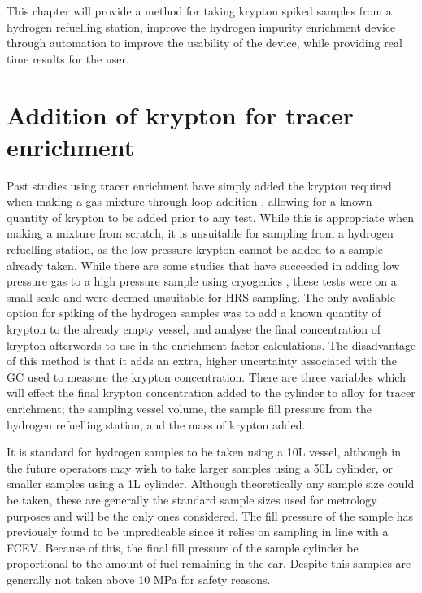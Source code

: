 This chapter will provide a method for taking krypton spiked samples from a hydrogen refuelling station, improve the hydrogen impurity enrichment device through automation to improve the usability of the device, while providing real time results for the user.

\section{Addition of krypton for tracer enrichment}\label{kryptonspike}
Past studies using tracer enrichment have simply added the krypton required when making a gas mixture through loop addition \cite{Murugan2014}, allowing for a known quantity of krypton to be added prior to any test. While this is appropriate when making a mixture from scratch, it is unsuitable for sampling from a hydrogen refuelling station, as the low pressure krypton cannot be added to a sample already taken. While there are some studies that have succeeded in adding low pressure gas to a high pressure sample using cryogenics \cite{Podesta2017}, these tests were on a small scale and were deemed unsuitable for HRS sampling. The only avaliable option for spiking of the hydrogen samples was to add a known quantity of krypton to the already empty vessel, and analyse the final concentration of krypton afterwords to use in the enrichment factor calculations. The disadvantage of this method is that it adds an extra, higher uncertainty associated with the GC used to measure the krypton concentration. There are three variables which will effect the final krypton concentration added to the cylinder to alloy for tracer enrichment; the sampling vessel volume, the sample fill pressure from the hydrogen refuelling station, and the mass of krypton added.  

It is standard for hydrogen samples to be taken using a 10L vessel, although in the future operators may wish to take larger samples using a 50L cylinder, or smaller samples using a 1L cylinder. Although theoretically any sample size could be taken, these are generally the standard sample sizes used for metrology purposes and will be the only ones considered. The fill pressure of the sample has previously found to be unpredicable since it relies on sampling in line with a FCEV. Because of this, the final fill pressure of the sample cylinder be proportional to the amount of fuel remaining in the car. Despite this samples are generally not taken above 10 MPa for safety reasons. 

